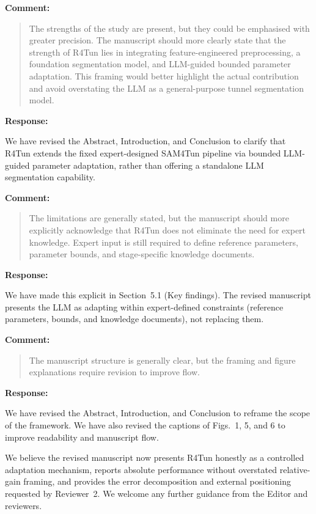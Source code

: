 \documentclass[11pt,a4paper]{article}
\newenvironment{commentblock}{%
  \par\smallskip\noindent\textbf{Comment:}\par
  \begin{quote}\itshape\color{black}
}{%
  \end{quote}\smallskip
}
\newenvironment{responseblock}{%
  \par\smallskip\noindent\textbf{Response:}\par
  \begingroup\color{responsegreen}
}{%
  \endgroup\smallskip
}
\begin{document}
\begin{commentblock}
The strengths of the study are present, but they could be emphasised with greater precision. The manuscript should more clearly state that the strength of R4Tun lies in integrating feature-engineered preprocessing, a foundation segmentation model, and LLM-guided bounded parameter adaptation. This framing would better highlight the actual contribution and avoid overstating the LLM as a general-purpose tunnel segmentation model.
\end{commentblock}
\begin{responseblock}
We have revised the Abstract, Introduction, and Conclusion to clarify that R4Tun extends the fixed expert-designed SAM4Tun pipeline via bounded LLM-guided parameter adaptation, rather than offering a standalone LLM segmentation capability.
\end{responseblock}

\begin{commentblock}
The limitations are generally stated, but the manuscript should more explicitly acknowledge that R4Tun does not eliminate the need for expert knowledge. Expert input is still required to define reference parameters, parameter bounds, and stage-specific knowledge documents.
\end{commentblock}
\begin{responseblock}
We have made this explicit in Section~5.1 (Key findings). The revised manuscript presents the LLM as adapting within expert-defined constraints (reference parameters, bounds, and knowledge documents), not replacing them.
\end{responseblock}

\begin{commentblock}
The manuscript structure is generally clear, but the framing and figure explanations require revision to improve flow.
\end{commentblock}
\begin{responseblock}
We have revised the Abstract, Introduction, and Conclusion to reframe the scope of the framework. We have also revised the captions of Figs.~1, 5, and 6 to improve readability and manuscript flow.
\end{responseblock}

\bigskip
\noindent We believe the revised manuscript now presents R4Tun honestly as a controlled adaptation mechanism, reports absolute performance without overstated relative-gain framing, and provides the error decomposition and external positioning requested by Reviewer~2. We welcome any further guidance from the Editor and reviewers.
\end{document}
